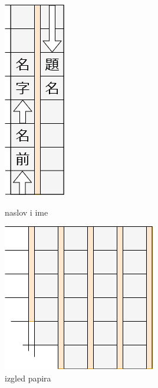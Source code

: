 	\begin{figure}[h]
		\centering
		\begin{minipage}{.45\textwidth}
			\centering
			\includegraphics[width=.29\textwidth]{017_pisanje_res/a2.png}
			\caption{naslov i ime}
		\end{minipage}
		\begin{minipage}{.45\textwidth}
			\centering
			\includegraphics[width=.75\textwidth]{017_pisanje_res/a1.png}
			\caption{izgled papira}
		\end{minipage}
	\end{figure}
	

